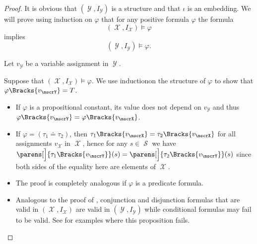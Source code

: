\begin{proof}
  It is obvious that \( (\mscrY, I_\mscrY) \) is a structure and that \( \iota \) is an embedding. We will prove using induction on \( \varphi \) that for any positive formula \( \varphi \) the formula
  \begin{equation*}
    (\mscrX, I_\mscrX) \vDash \varphi
  \end{equation*}
  implies
  \begin{equation*}
    (\mscrY, I_\mscrY) \vDash \varphi.
  \end{equation*}

  Let \( v_\mscrY \) be a variable assignment in \( \mscrY \).

  Suppose that \( (\mscrX, I_\mscrX) \vDash \varphi \). We use induction\IND on the structure of \( \varphi \) to show that \( \varphi\Bracks{v_\mscrY} = T \).
  \begin{itemize}
    \item If \( \varphi \) is a propositional constant, its value does not depend on \( v_\mscrY \) and thus \( \varphi\Bracks{v_\mscrY} = \varphi\Bracks{v_\mscrX} \).

    \item If \( \varphi = (\tau_1 \doteq \tau_2) \), then \( \tau_1\Bracks{v_\mscrX} = \tau_2\Bracks{v_\mscrX} \) for all assignments \( v_\mscrX \) in \( \mscrX \), hence for any \( s \in \mscrS \) we have \( \parens[\Big]{\tau_1\Bracks{v_\mscrY}}(s) = \parens[\Big]{\tau_2\Bracks{v_\mscrY}}(s) \) since both sides of the equality here are elements of \( \mscrX \).

    \item The proof is completely analogous if \( \varphi \) is a predicate formula.

    \item Analogous to the proof of , conjunction and disjunction formulas that are valid in \( (\mscrX, I_\mscrX) \) are valid in \( (\mscrY, I_\mscrY) \) while conditional formulas may fail to be valid. See  for examples where this proposition fails.
  \end{itemize}
\end{proof}

